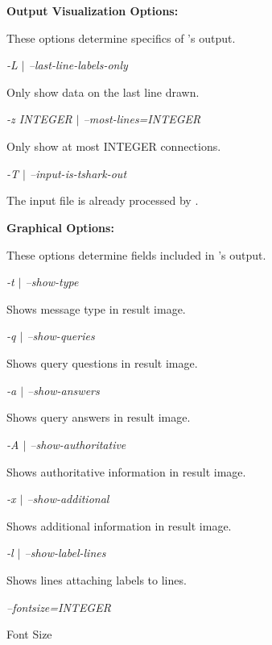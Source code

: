 {\bf Output Visualization Options:}

These options determine specifics of 's output.

\begin{description}

\item {\it -L $|$ --last-line-labels-only}\verb" "

Only show data on the last line drawn.

\item {\it -z INTEGER $|$ --most-lines=INTEGER}\verb" "

Only show at most INTEGER connections.

\item {\it -T $|$ --input-is-tshark-out}\verb" "

The input file is already processed by .

\end{description}

{\bf Graphical Options:}

These options determine fields included in 's output.

\begin{description}

\item {\it -t $|$ --show-type}\verb" "

Shows message type in result image.

\item {\it -q $|$ --show-queries}\verb" "

Shows query questions in result image.

\item {\it -a $|$ --show-answers}\verb" "

Shows query answers in result image.

\item {\it -A $|$ --show-authoritative}\verb" "

Shows authoritative information in result image.

\item {\it -x $|$ --show-additional}\verb" "

Shows additional information in result image.

\item {\it -l $|$ --show-label-lines}\verb" "

Shows lines attaching labels to lines.

\item {\it --fontsize=INTEGER}\verb" "

Font Size

\end{description}

